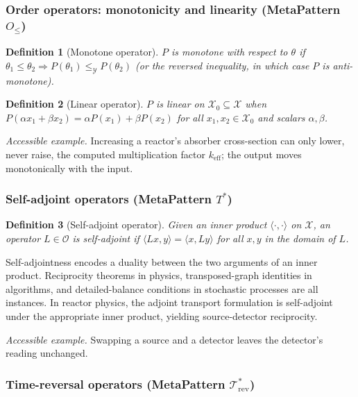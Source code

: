 \documentclass[acmsmall,screen,review]{acmart}
\newtheorem{definition}{Definition}
\begin{document}
\subsubsection{Order operators: monotonicity and linearity (MetaPattern $O_{\le}$)}

\begin{definition}[Monotone operator]
$P$ is \emph{monotone with respect to} $\theta$ if $\theta_1 \le \theta_2 \Rightarrow P(\theta_1) \le_{\mathcal{Y}} P(\theta_2)$ (or the reversed inequality, in which case $P$ is \emph{anti-monotone}).
\end{definition}

\begin{definition}[Linear operator]
$P$ is \emph{linear} on $\mathcal{X}_0 \subseteq \mathcal{X}$ when $P(\alpha x_1 + \beta x_2) = \alpha P(x_1) + \beta P(x_2)$ for all $x_1, x_2 \in \mathcal{X}_0$ and scalars $\alpha, \beta$.
\end{definition}

\emph{Accessible example.} Increasing a reactor's absorber cross-section can only lower, never raise, the computed multiplication factor $k_{\mathrm{eff}}$; the output moves monotonically with the input.

\subsubsection{Self-adjoint operators (MetaPattern $T^{*}$)}

\begin{definition}[Self-adjoint operator]
Given an inner product $\langle\cdot,\cdot\rangle$ on $\mathcal{X}$, an operator $L \in \mathcal{O}$ is \emph{self-adjoint} if $\langle Lx, y\rangle = \langle x, Ly\rangle$ for all $x, y$ in the domain of $L$.
\end{definition}

Self-adjointness encodes a duality between the two arguments of an inner product. Reciprocity theorems in physics, transposed-graph identities in algorithms, and detailed-balance conditions in stochastic processes are all instances. In reactor physics, the adjoint transport formulation is self-adjoint under the appropriate inner product, yielding source-detector reciprocity.

\emph{Accessible example.} Swapping a source and a detector leaves the detector's reading unchanged.

\subsubsection{Time-reversal operators (MetaPattern $\mathcal{T}^{*}_{\mathrm{rev}}$)}
\end{document}
